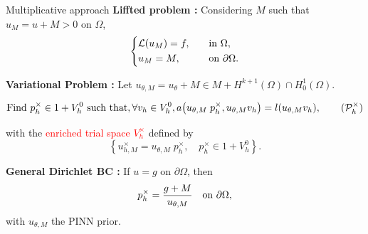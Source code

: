 \begin{appendixframe}{Multiplicative approach}
	\textbf{Liffted problem :} Considering $M$ such that $u_M=u+M>0$ on $\Omega$,
	\begin{equation*}
		\begin{dcases}
			\mathcal{L}(u_M)=f, &
			\text{\quad in } \Omega,          \\
			u_M = M,                  &
			\text{\quad on } \partial \Omega. \\
		\end{dcases}
	\end{equation*}

	\textbf{Variational Problem :} Let $u_{\theta,M}=u_\theta+M \in M + H^{k+1}(\Omega)\cap H^1_0(\Omega)$.
	
	\vspace{-5pt}
	\begin{equation}
		\label{eq:weaktimes}
		\text{Find } p_h^\times \in 1 + V_h^0 \text{ such that}, \forall v_h \in V_h^0, a \big(u_{\theta,M} \; p_h^\times,u_{\theta,M}  v_h \big) = l(u_{\theta,M} v_h),\tag{$\mathcal{P}_h^\times$}
	\end{equation}

	\vspace{5pt}
	\begin{minipage}[t]{0.6\linewidth}
		with the \textcolor{red}{enriched trial space $V_h^\times$} defined by
		\begin{equation*}
			\left\{
			u_{h,M}^\times = u_{\theta,M} \; p_h^\times,
			\quad p_h^\times \in 1+V_h^0
			\right\}.
		\end{equation*}
	
		\vspace{2pt}
		\textbf{General Dirichlet BC :} If $u=g$ on $\partial \Omega$, then
		\[
			p_h^\times = \frac{g+M}{u_{\theta,M}} \text{\quad on } \partial \Omega,
		\]
		with $u_{\theta,M}$ the PINN prior. 
	\end{minipage} 
\end{appendixframe}

